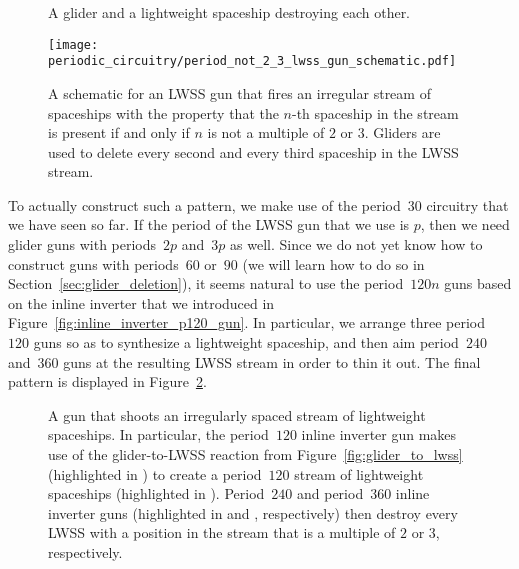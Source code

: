 \begin{figure}[!htb]
	\centering
	\begin{minipage}{0.28\textwidth}
		\centering\vspace*{0.86cm}
		\caption{A glider and a lightweight spaceship destroying each other.}\label{fig:glider_lwss_destroy}
	\end{minipage}\quad
	\begin{minipage}{0.69\textwidth}
		\centering
		\texttt{[image: periodic\_circuitry/period\_not\_2\_3\_lwss\_gun\_schematic.pdf]}
		\caption{A schematic for an LWSS gun that fires an irregular stream of spaceships with the property that the $n$-th spaceship in the stream is present if and only if $n$ is not a multiple of $2$ or $3$. Gliders are used to delete every second and every third spaceship in the LWSS stream.}
		\label{fig:period_not_2_3_lwss_gun_schematic}
	\end{minipage}
\end{figure}

To actually construct such a pattern, we make use of the period~$30$ circuitry that we have seen so far. If the period of the LWSS gun that we use is $p$, then we need glider guns with periods~$2p$ and~$3p$ as well. Since we do not yet know how to construct guns with periods~$60$ or~$90$ (we will learn how to do so in Section~\ref{sec:glider_deletion}), it seems natural to use the period~$120n$ guns based on the inline inverter that we introduced in Figure~\ref{fig:inline_inverter_p120_gun}. In particular, we arrange three period~$120$ guns so as to synthesize a lightweight spaceship, and then aim period~$240$ and~$360$ guns at the resulting LWSS stream in order to thin it out. The final pattern is displayed in Figure~\ref{fig:period_not_2_3_lwss_gun}.

\begin{figure}[!htb]
	\centering
	\caption{A gun that shoots an irregularly spaced stream of lightweight spaceships. In particular, the period~$120$ inline inverter gun makes use of the glider-to-LWSS reaction from Figure~\ref{fig:glider_to_lwss} (highlighted in ) to create a period~$120$ stream of lightweight spaceships (highlighted in ). Period~$240$ and period~$360$ inline inverter guns (highlighted in  and , respectively) then destroy every LWSS with a position in the stream that is a multiple of $2$ or $3$, respectively.}
	\label{fig:period_not_2_3_lwss_gun}
\end{figure}



